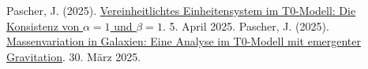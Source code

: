 \documentclass[12pt,a4paper]{article}
\theoremstyle{definition}
\theoremstyle{remark}
\begin{document}
	\begin{thebibliography}{9}
		 Pascher, J. (2025). \href{https://github.com/jpascher/T0-Time-Mass-Duality/tree/main/2/pdf/Deutsch/Die\%20Konsistenz\%20von\%20alpha\%20=\%201\%20und\%20beta\%20=\%201.pdf}{Vereinheitlichtes Einheitensystem im T0-Modell: Die Konsistenz von \(\alpha = 1\) und \(\beta = 1\)}. 5. April 2025.
		 Pascher, J. (2025). \href{https://github.com/jpascher/T0-Time-Mass-Duality/tree/main/2/pdf/Deutsch/Massenvariation\%20in\%20Galaxien.pdf}{Massenvariation in Galaxien: Eine Analyse im T0-Modell mit emergenter Gravitation}. 30. März 2025.
	\end{thebibliography}
	
\end{document}
